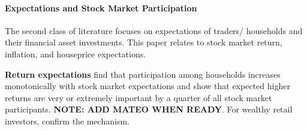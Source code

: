 \documentclass[ProjectABM]{subfiles}
\begin{document}




\paragraph{Expectations and Stock Market Participation}
The second class of literature focuses on expectations of traders/ households and their financial asset investments. This paper relates to stock market return, inflation, and houseprice expectations.

\textbf{Return expectations}
\cite{arrondel_et_al_2014subjective_return_expectation} find that participation among households increases monotonically with stock market expectations and \cite{choi_2020} show that expected higher returns are very or extremely important by a quarter of all stock market participants. \textbf{NOTE: ADD MATEO WHEN READY}. For wealthy retail investors, \cite{giglio_et_al_2019five} confirm the mechanism.
\end{document}
